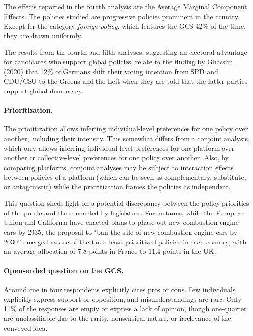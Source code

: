 \begin{small}
The effects reported in the fourth analysis are the Average Marginal Component Effects.\cite{hainmueller_causal_2014} The policies studied are progressive policies prominent in the country. Except for the category \textit{foreign policy}, which features the GCS 42\% of the time, they are drawn uniformly.

The results from the fourth and fifth analyses, suggesting an electoral advantage for candidates who support global policies, relate to the finding by Ghassim (2020) that 12\% of Germans shift their voting intention from SPD and CDU/CSU to the Greens and the Left when they are told that the latter parties support global democracy.\citep{ghassim_who_2020}


\paragraph{\small Prioritization.}
The prioritization allows inferring individual-level preferences for one policy over another, including their intensity. This somewhat differs from a conjoint analysis, which only allows inferring individual-level preferences for one platform over another or collective-level preferences for one policy over another. Also, by comparing platforms, conjoint analyses may be subject to interaction effects between policies of a platform (which can be seen as complementary, substitute, or antagonistic) while the prioritization frames the policies as independent.

This question sheds light on a potential discrepancy between the policy priorities of the public and those enacted by legislators. For instance, while the European Union and California have enacted plans to phase out new combustion-engine cars by 2035, the proposal to ``ban the sale of new combustion-engine cars by 2030'' emerged as one of the three least prioritized policies in each country, with an average allocation of 7.8 points in France to 11.4 points in the UK.

\paragraph{\small Open-ended question on the GCS.}
Around one in four respondents explicitly cites pros or cons. Few individuals explicitly express support or opposition, and misunderstandings are rare. Only 11\% of the responses are empty or express a lack of opinion, though one-quarter are unclassifiable due to the rarity, nonsensical nature, or irrelevance of the conveyed idea.


\end{small}

